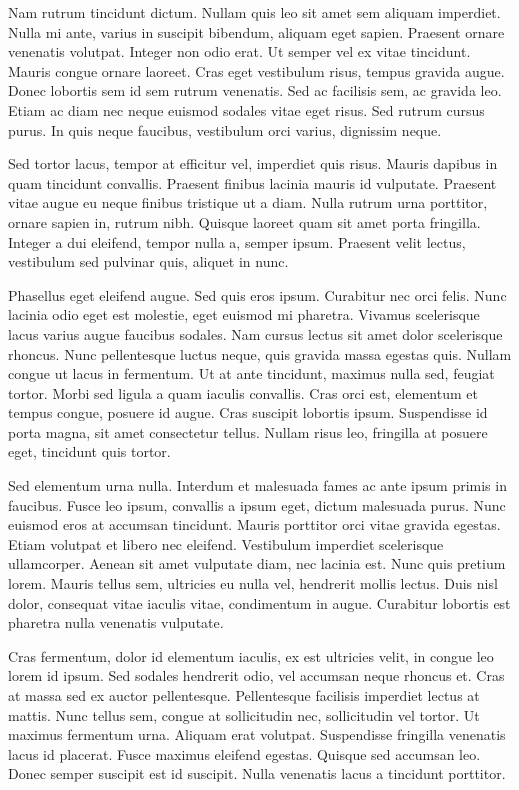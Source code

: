 \documentclass{homework}
\begin{document}
Nam rutrum tincidunt dictum. Nullam quis leo sit amet sem aliquam imperdiet. Nulla mi ante, varius in suscipit bibendum, aliquam eget sapien. Praesent ornare venenatis volutpat. Integer non odio erat. Ut semper vel ex vitae tincidunt. Mauris congue ornare laoreet. Cras eget vestibulum risus, tempus gravida augue. Donec lobortis sem id sem rutrum venenatis. Sed ac facilisis sem, ac gravida leo. Etiam ac diam nec neque euismod sodales vitae eget risus. Sed rutrum cursus purus. In quis neque faucibus, vestibulum orci varius, dignissim neque.

Sed tortor lacus, tempor at efficitur vel, imperdiet quis risus. Mauris dapibus in quam tincidunt convallis. Praesent finibus lacinia mauris id vulputate. Praesent vitae augue eu neque finibus tristique ut a diam. Nulla rutrum urna porttitor, ornare sapien in, rutrum nibh. Quisque laoreet quam sit amet porta fringilla. Integer a dui eleifend, tempor nulla a, semper ipsum. Praesent velit lectus, vestibulum sed pulvinar quis, aliquet in nunc.

Phasellus eget eleifend augue. Sed quis eros ipsum. Curabitur nec orci felis. Nunc lacinia odio eget est molestie, eget euismod mi pharetra. Vivamus scelerisque lacus varius augue faucibus sodales. Nam cursus lectus sit amet dolor scelerisque rhoncus. Nunc pellentesque luctus neque, quis gravida massa egestas quis. Nullam congue ut lacus in fermentum. Ut at ante tincidunt, maximus nulla sed, feugiat tortor. Morbi sed ligula a quam iaculis convallis. Cras orci est, elementum et tempus congue, posuere id augue. Cras suscipit lobortis ipsum. Suspendisse id porta magna, sit amet consectetur tellus. Nullam risus leo, fringilla at posuere eget, tincidunt quis tortor.

Sed elementum urna nulla. Interdum et malesuada fames ac ante ipsum primis in faucibus. Fusce leo ipsum, convallis a ipsum eget, dictum malesuada purus. Nunc euismod eros at accumsan tincidunt. Mauris porttitor orci vitae gravida egestas. Etiam volutpat et libero nec eleifend. Vestibulum imperdiet scelerisque ullamcorper. Aenean sit amet vulputate diam, nec lacinia est. Nunc quis pretium lorem. Mauris tellus sem, ultricies eu nulla vel, hendrerit mollis lectus. Duis nisl dolor, consequat vitae iaculis vitae, condimentum in augue. Curabitur lobortis est pharetra nulla venenatis vulputate.

Cras fermentum, dolor id elementum iaculis, ex est ultricies velit, in congue leo lorem id ipsum. Sed sodales hendrerit odio, vel accumsan neque rhoncus et. Cras at massa sed ex auctor pellentesque. Pellentesque facilisis imperdiet lectus at mattis. Nunc tellus sem, congue at sollicitudin nec, sollicitudin vel tortor. Ut maximus fermentum urna. Aliquam erat volutpat. Suspendisse fringilla venenatis lacus id placerat. Fusce maximus eleifend egestas. Quisque sed accumsan leo. Donec semper suscipit est id suscipit. Nulla venenatis lacus a tincidunt porttitor.
\end{document}
